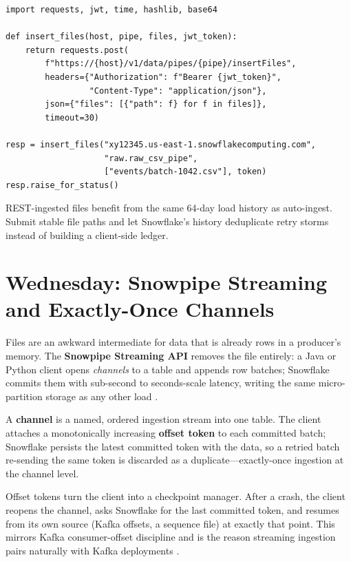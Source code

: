\begin{lstlisting}[caption={Snowpipe REST call (Python, key-pair JWT)}]
import requests, jwt, time, hashlib, base64

def insert_files(host, pipe, files, jwt_token):
    return requests.post(
        f"https://{host}/v1/data/pipes/{pipe}/insertFiles",
        headers={"Authorization": f"Bearer {jwt_token}",
                 "Content-Type": "application/json"},
        json={"files": [{"path": f} for f in files]},
        timeout=30)

resp = insert_files("xy12345.us-east-1.snowflakecomputing.com",
                    "raw.raw_csv_pipe",
                    ["events/batch-1042.csv"], token)
resp.raise_for_status()
\end{lstlisting}

\begin{tipbox}
REST-ingested files benefit from the same 64-day load history as auto-ingest. Submit stable file paths and let Snowflake's history deduplicate retry storms instead of building a client-side ledger.
\end{tipbox}

\section{Wednesday: Snowpipe Streaming and Exactly-Once Channels}
Files are an awkward intermediate for data that is already rows in a producer's memory. The \textbf{Snowpipe Streaming API} removes the file entirely: a Java or Python client opens \emph{channels} to a table and appends row batches; Snowflake commits them with sub-second to seconds-scale latency, writing the same micro-partition storage as any other load \cite{snowflakeSnowpipeStreamingDocs}.

\begin{definitionbox}
A \textbf{channel} is a named, ordered ingestion stream into one table. The client attaches a monotonically increasing \textbf{offset token} to each committed batch; Snowflake persists the latest committed token with the data, so a retried batch re-sending the same token is discarded as a duplicate---exactly-once ingestion at the channel level.
\end{definitionbox}

Offset tokens turn the client into a checkpoint manager. After a crash, the client reopens the channel, asks Snowflake for the last committed token, and resumes from its own source (Kafka offsets, a sequence file) at exactly that point. This mirrors Kafka consumer-offset discipline and is the reason streaming ingestion pairs naturally with Kafka deployments \cite{kafkaDocs}.

